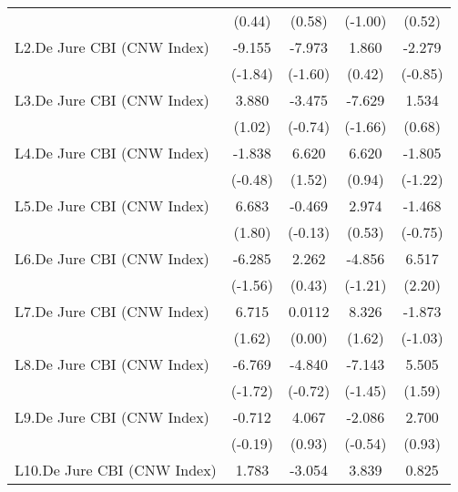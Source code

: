 {\begin{longtable}{l*{4}{c}}
                &   (0.44)         &   (0.58)         &  (-1.00)         &   (0.52)         \\
\addlinespace
L2.De Jure CBI (CNW Index)&   -9.155         &   -7.973         &    1.860         &   -2.279         \\
                &  (-1.84)         &  (-1.60)         &   (0.42)         &  (-0.85)         \\
\addlinespace
L3.De Jure CBI (CNW Index)&    3.880         &   -3.475         &   -7.629         &    1.534         \\
                &   (1.02)         &  (-0.74)         &  (-1.66)         &   (0.68)         \\
\addlinespace
L4.De Jure CBI (CNW Index)&   -1.838         &    6.620         &    6.620         &   -1.805         \\
                &  (-0.48)         &   (1.52)         &   (0.94)         &  (-1.22)         \\
\addlinespace
L5.De Jure CBI (CNW Index)&    6.683         &   -0.469         &    2.974         &   -1.468         \\
                &   (1.80)         &  (-0.13)         &   (0.53)         &  (-0.75)         \\
\addlinespace
L6.De Jure CBI (CNW Index)&   -6.285         &    2.262         &   -4.856         &    6.517\sym{*}  \\
                &  (-1.56)         &   (0.43)         &  (-1.21)         &   (2.20)         \\
\addlinespace
L7.De Jure CBI (CNW Index)&    6.715         &   0.0112         &    8.326         &   -1.873         \\
                &   (1.62)         &   (0.00)         &   (1.62)         &  (-1.03)         \\
\addlinespace
L8.De Jure CBI (CNW Index)&   -6.769         &   -4.840         &   -7.143         &    5.505         \\
                &  (-1.72)         &  (-0.72)         &  (-1.45)         &   (1.59)         \\
\addlinespace
L9.De Jure CBI (CNW Index)&   -0.712         &    4.067         &   -2.086         &    2.700         \\
                &  (-0.19)         &   (0.93)         &  (-0.54)         &   (0.93)         \\
\addlinespace
L10.De Jure CBI (CNW Index)&    1.783         &   -3.054         &    3.839         &    0.825         \\

\end{longtable}}
